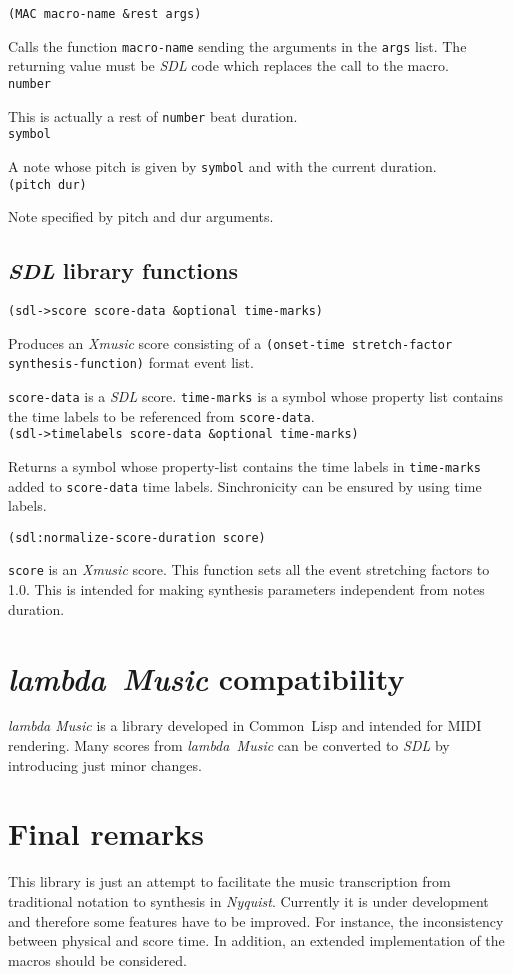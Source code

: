 \noindent\texttt{(MAC macro-name \&rest args)} \par
Calls the function \texttt{macro-name} sending the arguments in the \texttt{args} list. The returning value must be \textit{SDL} code which replaces the call to the macro. \\

\noindent\texttt{number}\par
 This is actually a rest of \texttt{number} beat duration.\\

\noindent\texttt{symbol}\par
A note whose pitch is given by \texttt{symbol} and with the current duration.\\ 

\noindent\texttt{(pitch dur)} \par
Note specified by pitch and dur arguments.  

\subsection{\textit{SDL} library functions}
\noindent\texttt{(sdl->score score-data \&optional time-marks)}\par
Produces an \textit{Xmusic} score consisting of a  \mbox{\texttt{(onset-time stretch-factor synthesis-function)}} format event list.\par
\noindent\texttt{score-data} is a \textit{SDL} score. \texttt{time-marks} is a symbol whose property list contains the time labels to be referenced from \texttt{score-data}.\\

\noindent\texttt{(sdl->timelabels score-data \&optional time-marks)}\par
Returns a symbol whose property-list contains the time labels in \texttt{time-marks} added to \texttt{score-data} time labels. Sinchronicity can be ensured by using time labels.

\noindent\texttt{(sdl:normalize-score-duration score)}\par
\texttt{score} is an \textit{Xmusic} score. This function sets all the event stretching factors to 1.0. This is intended for making synthesis parameters independent from notes duration.

\section{\textit{lambda~Music} compatibility}
\textit{lambda Music} is a library developed in Common~Lisp and intended for MIDI rendering. Many scores from \textit{lambda~Music} can be converted to \textit{SDL} by introducing just minor changes.   

\section{Final remarks}
This library is just an attempt to facilitate the music transcription from traditional notation to synthesis in \textit{Nyquist}. Currently it is under development and therefore  some features have to be improved. For instance, the inconsistency between physical and score time. In addition, an extended implementation of the macros should be considered.

